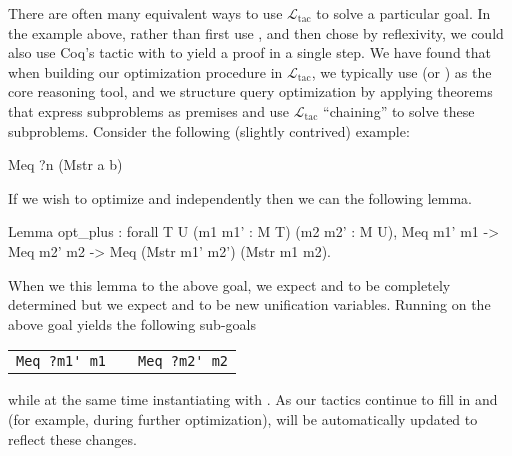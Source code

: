 \documentclass[preprint]{sigplanconf}
\newcommand{\ltac}[0]{\ensuremath{\mathcal{L}_{\mathrm{tac}}}}
\begin{document}
There are often many equivalent ways to use \ltac{} to solve a particular goal.  In the example above, rather than first use , and then chose  by reflexivity, we could also use Coq's  tactic with  to yield a proof in a single step.  We have found that when building our optimization procedure in \ltac{}, we typically use  (or ) as the core reasoning tool, and we structure query optimization by applying theorems that express subproblems as premises and use \ltac{} ``chaining'' to solve these subproblems.  Consider the following (slightly contrived) example:





\begin{coq}
Meq ?n (Mstr a b)
\end{coq}
If we wish to optimize  and  independently then we can  the following lemma.
\begin{coq}
Lemma opt_plus : forall {T U} (m1 m1' : M T) (m2 m2' : M U),
  Meq m1' m1 ->
  Meq m2' m2 ->
  Meq (Mstr m1' m2') (Mstr m1 m2).
\end{coq}
When we  this lemma to the above goal, we expect  and  to be completely determined but we expect  and  to be new unification variables.
Running  on the above goal yields the following sub-goals
\begin{center}
\begin{tabular}{ccc}
\lstinline!Meq ?m1' m1! & \qquad & \lstinline!Meq ?m2' m2! \\
\end{tabular}
\end{center}
while at the same time instantiating  with .
As our tactics continue to fill in  and  (for example, during further optimization),  will be automatically updated to reflect these changes.  
\end{document}
